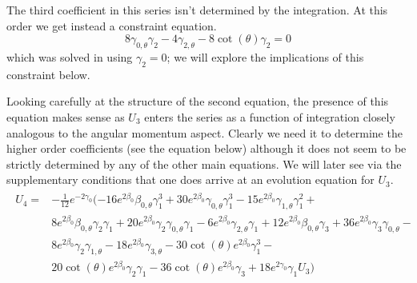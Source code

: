 \documentclass[a4paper,11pt]{article}
\numberwithin{equation}{section}
\begin{document}
The third coefficient in this series isn't determined by the integration. At this order we get instead a constraint equation.
\begin{equation}
8 \gamma_{0,\theta} \gamma_2-4 \gamma_{2,\theta}-8 \cot (\theta ) \gamma_2=0
\end{equation}
which was solved in \cite{Bondi:1962px} using $\gamma_2=0$; we will explore the implications of this constraint below. \par
 
Looking carefully at the structure of the second equation, the presence of this equation makes sense as $U_3$ enters the series as a function of integration closely analogous to the angular momentum aspect. Clearly we need it to determine the higher order coefficients (see the equation below) although it does not seem to be strictly determined by any of the other main equations. We will later see via the supplementary conditions that one does arrive at an evolution equation for $U_3$.  
\begin{align}
\begin{split}
U_4=&-\frac{1}{12} e^{-2 \gamma _{0}} (-16 e^{2 \beta _{0}} \beta _{0, \theta} \gamma _{1}^3+ 30 e^{2 \beta _{0}} \gamma _{0, \theta} \gamma _{1}^3-15 e^{2 \beta _{0}} \gamma _{1, \theta} \gamma _{1}^2+ \\  
 &8 e^{2 \beta _{0}} \beta _{0, \theta} \gamma _{2} \gamma _{1}+20 e^{2 \beta _{0}} \gamma _{2} \gamma _{0, \theta} \gamma _{1}- 6 e^{2 \beta _{0}} \gamma _{2, \theta} \gamma _{1}+12 e^{2 \beta _{0}} \beta _{0, \theta} \gamma _{3}+ 36 e^{2 \beta _{0}} \gamma _{3} \gamma _{0, \theta}-\\
 & 8 e^{2 \beta _{0}} \gamma _{2} \gamma _{1, \theta}- 18 e^{2 \beta _{0}} \gamma _{3,\theta}-30 \cot (\theta ) e^{2 \beta _{0}} \gamma _{1}^3- \\
 & 20 \cot (\theta ) e^{2 \beta _{0}} \gamma _{2} \gamma _{1}-36 \cot (\theta ) e^{2 \beta _{0}} \gamma _{3}+18 e^{2 \gamma _{0}} \gamma _{1} U_{3}) 
\end{split}
\end{align}
\end{document}
